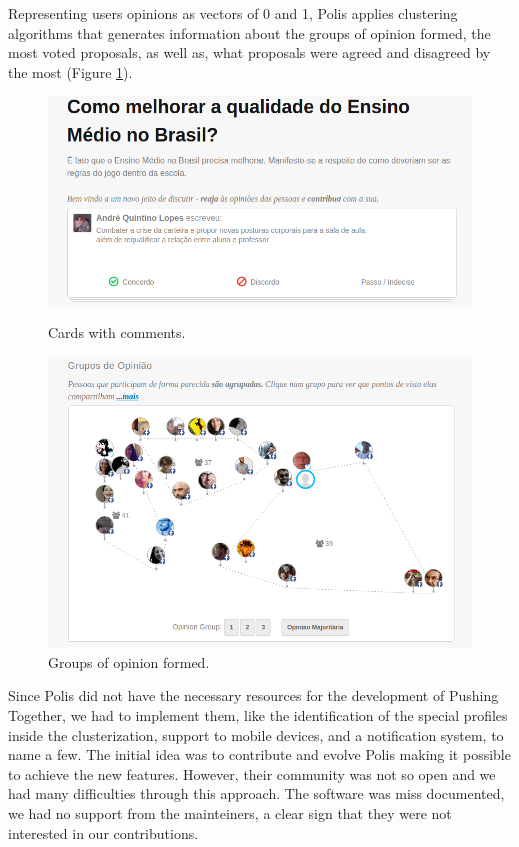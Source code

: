 \documentclass{llncs}
\begin{document}
  Representing users opinions as vectors of 0 and 1, Polis applies clustering
algorithms that generates information about the groups of opinion formed, the
most voted proposals, as well as, what proposals were agreed and disagreed by
the most (Figure \ref{fig:polis-2}). 

 \begin{figure}[hbt]
   \centering
   \begin{minipage}{.50\textwidth}
     \includegraphics[width=.9\linewidth]{images/polis1.png}
     \caption{Cards with comments.}
     \label{fig:polis-1}
   \end{minipage}
   \begin{minipage}{.49\textwidth}
     \includegraphics[width=.9\linewidth]{images/polis2.png}
     \caption{Groups of opinion formed.}
     \label{fig:polis-2}
   \end{minipage}
 \end{figure}

  Since Polis did not have the necessary resources for the development of
Pushing Together, we had to implement them, like the identification of the
special profiles inside the clusterization, support to mobile devices, and a
notification system, to name a few. The initial idea was to contribute and
evolve Polis making it possible to achieve the new features. However, their
community was not so open and we had many difficulties through this approach.
The software was miss documented, we had no support from the mainteiners, a
clear sign that they were not interested in our contributions.
\end{document}
